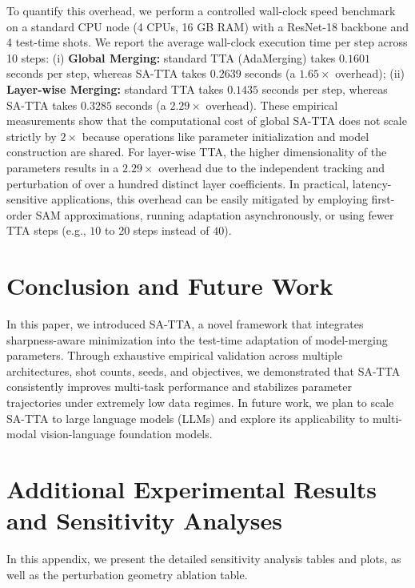 \documentclass{article}
\theoremstyle{plain}
\theoremstyle{definition}
\theoremstyle{remark}
\begin{document}
To quantify this overhead, we perform a controlled wall-clock speed benchmark on a standard CPU node (4 CPUs, 16 GB RAM) with a ResNet-18 backbone and 4 test-time shots. We report the average wall-clock execution time per step across 10 steps: (i) \textbf{Global Merging:} standard TTA (AdaMerging) takes $0.1601$ seconds per step, whereas SA-TTA takes $0.2639$ seconds (a $1.65\times$ overhead); (ii) \textbf{Layer-wise Merging:} standard TTA takes $0.1435$ seconds per step, whereas SA-TTA takes $0.3285$ seconds (a $2.29\times$ overhead). These empirical measurements show that the computational cost of global SA-TTA does not scale strictly by $2\times$ because operations like parameter initialization and model construction are shared. For layer-wise TTA, the higher dimensionality of the parameters results in a $2.29\times$ overhead due to the independent tracking and perturbation of over a hundred distinct layer coefficients. In practical, latency-sensitive applications, this overhead can be easily mitigated by employing first-order SAM approximations, running adaptation asynchronously, or using fewer TTA steps (e.g., $10$ to $20$ steps instead of $40$).

\section{Conclusion and Future Work}
\label{sec:conclusion}

In this paper, we introduced SA-TTA, a novel framework that integrates sharpness-aware minimization into the test-time adaptation of model-merging parameters. Through exhaustive empirical validation across multiple architectures, shot counts, seeds, and objectives, we demonstrated that SA-TTA consistently improves multi-task performance and stabilizes parameter trajectories under extremely low data regimes. In future work, we plan to scale SA-TTA to large language models (LLMs) and explore its applicability to multi-modal vision-language foundation models.

\nocite{*}



\onecolumn
\appendix
\section{Additional Experimental Results and Sensitivity Analyses}
\label{sec:appendix}

In this appendix, we present the detailed sensitivity analysis tables and plots, as well as the perturbation geometry ablation table.
\end{document}
